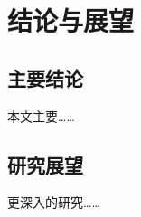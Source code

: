 \clearpage
{}
\section{结论与展望}

\subsection{主要结论}
本文主要……

\subsection{研究展望}
更深入的研究…… \cite{yang1999}
